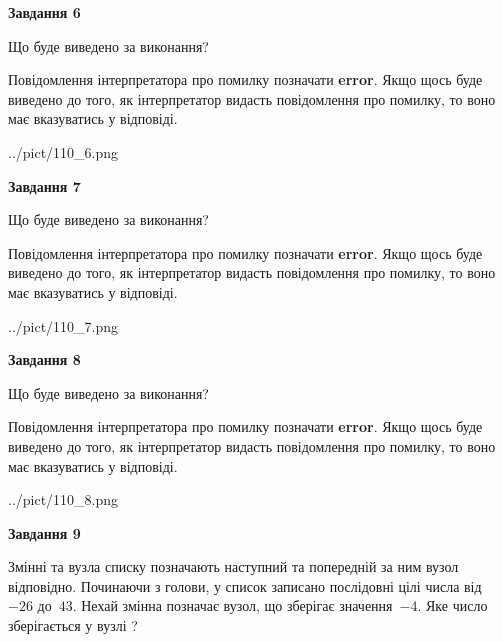 \documentclass[12pt, ukrainian]{article}
\begin{document}
{\begin {large}
{\begin {center}\textbf{Завдання 6}\end {center}}\par
Що буде виведено за виконання?

Повідомлення інтерпретатора про помилку позначати \textbf{error}.
Якщо щось буде виведено до того, як інтерпретатор видасть повідомлення про помилку, 
то воно має вказуватись у відповіді. \par


\begin{center}
	{../pict/110_6.png}
\end{center}
\newpage

{\begin {center}\textbf{Завдання 7}\end {center}}\par
Що буде виведено за виконання?

Повідомлення інтерпретатора про помилку позначати \textbf{error}.
Якщо щось буде виведено до того, як інтерпретатор видасть повідомлення про помилку, 
то воно має вказуватись у відповіді. \par


\begin{center}
	{../pict/110_7.png}
\end{center}
\newpage

{\begin {center}\textbf{Завдання 8}\end {center}}\par
Що буде виведено за виконання?

Повідомлення інтерпретатора про помилку позначати \textbf{error}.
Якщо щось буде виведено до того, як інтерпретатор видасть повідомлення про помилку, 
то воно має вказуватись у відповіді. \par


\begin{center}
	{../pict/110_8.png}
\end{center}
\newpage

{\begin {center}\textbf{Завдання 9}\end {center}}\par
Змінні  та  вузла списку позначають наступний та попередній за ним вузол відповідно. Починаючи з голови, у список записано послідовні цілі числа від~$-26$ до~$43$. Нехай змінна  позначає вузол, що зберігає значення~$-4$.
Яке число зберігається у вузлі  ?\par
\newpage


\end{large}}
\end{document}
